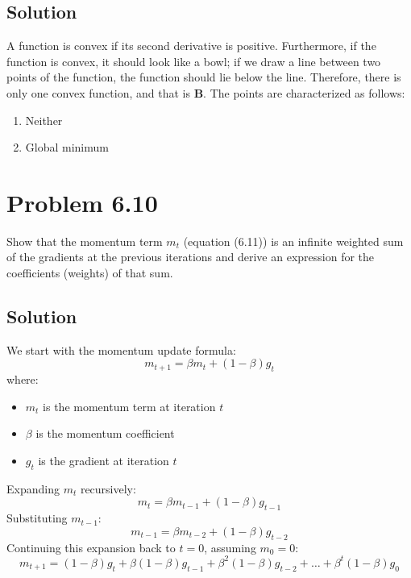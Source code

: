 \documentclass[10pt]{article}
\begin{document}
\subsection{Solution}
A function is convex if its second derivative is positive. Furthermore, if the function is convex, it should look like a bowl; if we draw a line between two points of the function, the function should lie below the line. Therefore, there is only one convex function, and that is \textbf{B}. The points are characterized as follows: 
\begin{enumerate}
    \item Neither
    \item Global minimum
\end{enumerate}

\vspace{5em}

\section*{Problem 6.10}
Show that the momentum term \( m_t \) (equation (6.11)) is an infinite weighted sum of the gradients at the previous iterations and derive an expression for the coefficients (weights) of that sum.


\subsection{Solution}

We start with the momentum update formula:
\begin{equation}
    m_{t+1} = \beta m_t + (1 - \beta) g_t
\end{equation}
where:
\begin{itemize}
    \item $m_t$ is the momentum term at iteration $t$
    \item $\beta$ is the momentum coefficient
    \item $g_t$ is the gradient at iteration $t$
\end{itemize}

Expanding $m_t$ recursively:
\begin{equation}
    m_t = \beta m_{t-1} + (1 - \beta) g_{t-1}
\end{equation}
Substituting $m_{t-1}$:
\begin{equation}
    m_{t-1} = \beta m_{t-2} + (1 - \beta) g_{t-2}
\end{equation}
Continuing this expansion back to $t = 0$, assuming $m_0 = 0$:
\begin{equation}
    m_{t+1} = (1 - \beta) g_t + \beta (1 - \beta) g_{t-1} + \beta^2 (1 - \beta) g_{t-2} + \dots + \beta^t (1 - \beta) g_0
\end{equation}
\end{document}

